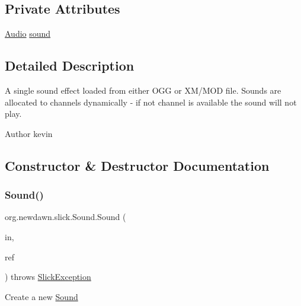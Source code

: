 \subsection*{Private Attributes}
\begin{DoxyCompactItemize}
\item 
\mbox{\hyperlink{interfaceorg_1_1newdawn_1_1slick_1_1openal_1_1_audio}{Audio}} \mbox{\hyperlink{classorg_1_1newdawn_1_1slick_1_1_sound_aefd4460784b86c7003356f59cafe3dc8}{sound}}
\end{DoxyCompactItemize}


\subsection{Detailed Description}
A single sound effect loaded from either O\+GG or X\+M/\+M\+OD file. Sounds are allocated to channels dynamically -\/ if not channel is available the sound will not play.

\begin{DoxyAuthor}{Author}
kevin 
\end{DoxyAuthor}


\subsection{Constructor \& Destructor Documentation}
\mbox{\label{classorg_1_1newdawn_1_1slick_1_1_sound_af9897c7ca26fa283c24b02a45e4b26a0}} 
\subsubsection{\texorpdfstring{Sound()}{Sound()}\hspace{0.1cm}{\footnotesize\ttfamily [1/3]}}
{\footnotesize\ttfamily org.\+newdawn.\+slick.\+Sound.\+Sound (\begin{DoxyParamCaption}\item[{Input\+Stream}]{in,  }\item[{String}]{ref }\end{DoxyParamCaption}) throws \mbox{\hyperlink{classorg_1_1newdawn_1_1slick_1_1_slick_exception}{Slick\+Exception}}\hspace{0.3cm}{\ttfamily [inline]}}

Create a new \mbox{\hyperlink{classorg_1_1newdawn_1_1slick_1_1_sound}{Sound}}


